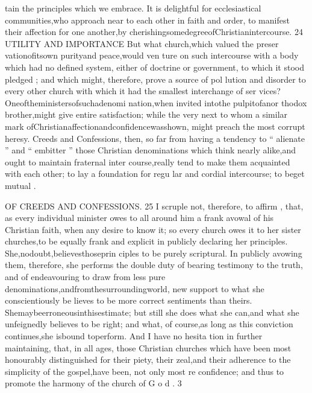 \documentclass[
]{book}
\begin{document}
tain the principles which we embrace. It is delightful for ecclesiastical communities,who
approach near to each other in faith and order, to manifest their affection for one another,by
cherishingsomedegreeofChristianintercourse.
24 UTILITY AND IMPORTANCE
But what church,which valued the preser
vationofitsown purityand peace,would ven
ture on such intercourse with a body which
had no defined system, either of doctrine or
government, to which it stood pledged ; and which might, therefore, prove a source of pol
lution and disorder to every other church with which it had the smallest interchange of ser vices? Oneoftheministersofsuchadenomi nation,when invited intothe pulpitofanor
thodox brother,might give entire satisfaction; while the very next to whom a similar mark ofChristianaffectionandconfidencewasshown, might preach the most corrupt heresy. Creeds
and Confessions, then, so far from having a tendency to `` alienate '' and `` embitter '' those Christian denominations which think nearly alike,and ought to maintain fraternal inter
course,really tend to make them acquainted with each other; to lay a foundation for regu
lar and cordial intercourse; to beget mutual
.

OF CREEDS AND CONFESSIONS. 25
I scruple not, therefore, to affirm , that, as every individual minister owes to all around
him a frank avowal of his Christian faith,
when any desire to know it; so every church owes it to her sister churches,to be equally
frank and explicit in publicly declaring her principles. She,nodoubt,believesthoseprin ciples to be purely scriptural. In publicly avowing them, therefore, she performs the double duty of bearing testimony to the truth, and of endeavouring to draw from less pure denominations,andfromthesurroundingworld, new support to what she conscientiously be lieves to be more correct sentiments than theirs. Shemaybeerroneousinthisestimate; but still she does what she can,and what she unfeignedly believes to be right; and what, of course,as long as this conviction continues,she isbound toperform. And I have no hesita tion in further maintaining, that, in all ages, those Christian churches which have been most honourably distinguished for their piety, their zeal,and their adherence to the simplicity of the gospel,have been, not only most re
confidence; and thus to promote the harmony of the church of G o d .
3
\end{document}
